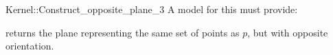 \begin{ccRefFunctionObjectConcept}{Kernel::Construct_opposite_plane_3}
A model for this must provide:


{returns the plane representing the same set of points as $p$,
but with opposite orientation.}

\ccIsModel{}

\end{ccRefFunctionObjectConcept}
